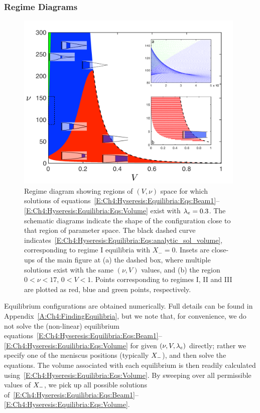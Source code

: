 \subsubsection{Regime Diagrams}
\begin{figure}[t]
\centering
\includegraphics[width = 0.98\textwidth]{detailed_regime_diagram}
\caption{Regime diagram showing regions of $(V, \nu)$ space for which solutions of equations~\eqref{E:Ch4:Hyseresis:Equilibria:Eqs:Beam1}--\eqref{E:Ch4:Hyseresis:Equilibria:Eqs:Volume}  exist with $\lambda_e = 0.3$. The schematic diagrams indicate the shape of the configuration close to that region of parameter space. The black dashed curve indicates~\eqref{E:Ch4:Hyseresis:Equilibria:Eqs:analytic_sol_volume}, corresponding to regime I equilibria with $X_- = 0$. Insets are close-ups of the main figure at (a) the dashed box, where multiple solutions exist with the same $(\nu, V)$ values, and (b) the region $0 < \nu < 17$, $0<V<1$. Points corresponding to regimes I, II and III are plotted as red, blue and green points, respectively. }\label{fig:Ch4:Hysteresis:ExampleRegimeDiagram}
\end{figure}

Equilibrium configurations are obtained numerically. Full details can be found in Appendix~\ref{A:Ch4:FindingEquilibria}, but we note that, for convenience, we do not solve the (non-linear) equilibrium equations~\eqref{E:Ch4:Hyseresis:Equilibria:Eqs:Beam1}--\eqref{E:Ch4:Hyseresis:Equilibria:Eqs:Volume} for given $(\nu, V, \lambda_e)$ directly; rather we specify one of the meniscus positions (typically $X_{-}$), and then solve the equations. The volume associated with each equilibrium is then readily calculated using~\eqref{E:Ch4:Hyseresis:Equilibria:Eqs:Volume}. By sweeping over all permissible values of $X_{-}$, we pick up all possible solutions of~\eqref{E:Ch4:Hyseresis:Equilibria:Eqs:Beam1}--\eqref{E:Ch4:Hyseresis:Equilibria:Eqs:Volume}.

